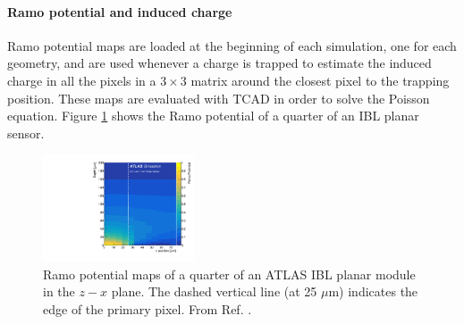 \paragraph*{Ramo potential and induced charge}
Ramo potential maps are loaded at the beginning of each simulation, one for each geometry, and are used whenever a charge is trapped to estimate the induced charge in all the pixels in a $3\times3$ matrix around the closest pixel to the trapping position. These maps are evaluated with TCAD in order to solve the Poisson equation. Figure \ref{fig:RamoMapsPlanar} shows the Ramo potential of a quarter of an IBL planar sensor.


\begin{figure}[!htb]
\centering
\includegraphics[width=0.4\textwidth]{figures/SensorSimulation/arXivversion_fig_14.pdf}
\caption{Ramo potential maps of a quarter of an ATLAS IBL planar module in the $z-x$ plane. The dashed vertical line (at 25 $\mu$m) indicates the edge of the primary pixel. From Ref. \cite{Aaboud:2019wgd}.}
\label{fig:RamoMapsPlanar}
\end{figure}







